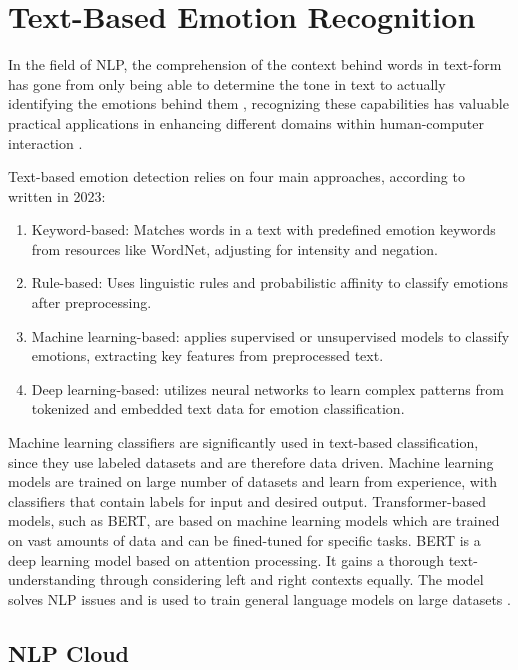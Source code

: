  

\section{Text-Based Emotion Recognition}

In the field of NLP, the comprehension of the context behind words in text-form has gone from only being able to determine the tone in text to actually identifying the emotions behind them \autocite{Esfahani2024}, recognizing these capabilities has valuable practical applications in enhancing different domains within human-computer interaction \autocite{Shelke2022}.

 Text-based emotion detection relies on four main approaches, according to \autocite{Kusal2023} written in 2023:

 \begin{enumerate}
     \item Keyword-based: Matches words in a text with predefined emotion keywords from resources like WordNet, adjusting for intensity and negation.
     \item Rule-based: Uses linguistic rules and probabilistic affinity to classify emotions after preprocessing.
     \item Machine learning-based: applies supervised or unsupervised models to classify emotions, extracting key features from preprocessed text.
     \item Deep learning-based: utilizes neural networks to learn complex patterns from tokenized and embedded text data for emotion classification.
 \end{enumerate}

Machine learning classifiers are significantly used in text-based classification, since they use labeled datasets and are therefore data driven. Machine learning models are trained on large number of datasets and learn from experience, with classifiers that contain labels for input and desired output. Transformer-based models, such as BERT, are based on machine learning models which are trained on vast amounts of data and can be fined-tuned for specific tasks. BERT is a deep learning model based on attention processing. It gains a thorough text-understanding through considering left and right contexts equally. The model solves NLP issues and is used to train general language models on large datasets \autocite{Kusal2024}.

\subsection{NLP Cloud}

